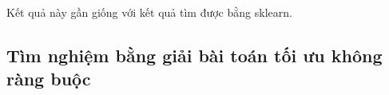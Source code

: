  
 
 
 
 
Kết quả này gần giống với kết quả tìm được bằng sklearn. 

\subsection{Tìm nghiệm bằng giải bài toán tối ưu không ràng buộc }

